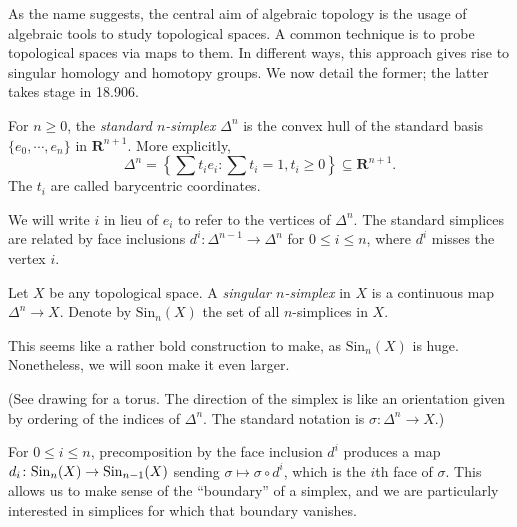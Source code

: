As the name suggests, the central aim of algebraic topology is the usage of algebraic tools to study topological spaces. A common technique is to probe topological spaces via maps to them. In different ways, this approach gives rise to singular homology and homotopy groups. We now detail the former; the latter takes stage in 18.906.
\begin{definition}
For $n\geq 0$, the \emph{standard $n$-simplex} $\Delta^n$ is the convex hull of the standard basis $\{e_0,\cdots,e_n\}$ in $\mathbf{R}^{n+1}$. More explicitly,
$$\Delta^n = \left\{\sum t_i e_i : \sum t_i = 1, t_i\geq 0\right\}\subseteq\mathbf{R}^{n+1}.$$
The $t_i$ are called barycentric coordinates.
\end{definition}
We will write $i$ in lieu of $e_i$ to refer to the vertices of $\Delta^n$. The standard simplices are related by face inclusions $d^i\colon \Delta^{n-1} \to \Delta^{n}$ for $0\leq i \leq n$, where $d^i$ misses the vertex $i$. 
\begin{definition}
Let $X$ be any topological space. A \emph{singular $n$-simplex} in $X$ is a continuous map $\Delta^n\to X$. Denote by $\mathrm{Sin}_n(X)$ the set of all $n$-simplices in $X$.
    
    This seems like a rather bold construction to make, as $\mathrm{Sin}_n(X)$ is huge. Nonetheless, we will soon make it even larger.
\end{definition}
(See drawing for a torus. The direction of the simplex is like an orientation given by ordering of the indices of $\Delta^n$. The standard notation is $\sigma:\Delta^n\to X$.)

For $0\leq i \leq n$, precomposition by the face inclusion $d^i$ produces a map $d_i\colon \mathrm{Sin}_n(X)\to\mathrm{Sin}_{n-1}(X)$ sending $\sigma\mapsto\sigma\circ d^i$, which is the $i$th face of $\sigma$. This allows us to make sense of the ``boundary'' of a simplex, and we are particularly interested in simplices for which that boundary vanishes.

